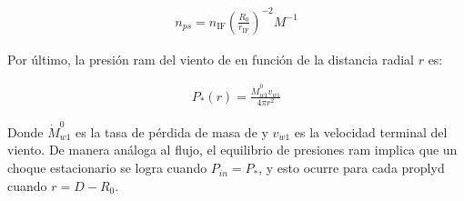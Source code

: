 \begin{align}
  n_{ps} = n_{\mathrm{IF}}\left(\frac{R_0}{r_{\mathrm{IF}}}\right)^{-2} M^{-1} \label{eq:density-scale}
\end{align}


Por último, la presión ram del viento de \thC{} en función de la distancia radial $r$ es:

\begin{align}
  P_*(r) = \frac{\dot{M}^{0}_{w1}v_{w1}}{4\pi r^2} \label{eq:P-star}
\end{align}

 Donde $\dot{M}^{0}_{w1}$ es la tasa de pérdida de masa de \thC{} y $v_{w1}$ es la velocidad terminal del viento. De manera análoga al flujo, el equilibrio de presiones ram implica que un choque estacionario se logra cuando $P_{in} = P_*$, y esto ocurre para cada proplyd cuando $r = D-R_0$. %


